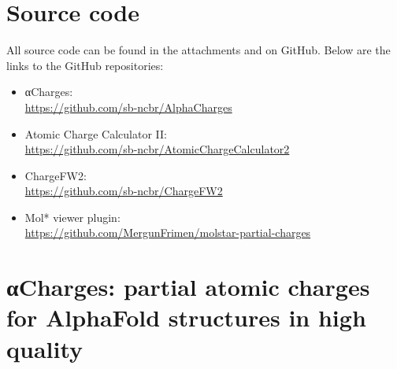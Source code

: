 \documentclass[
  digital,     %
  oneside,     %
  nosansbold,  %
  nocolorbold, %
  lof,         %
  lot,         %
]{fithesis4}
\begin{document}
\begin{appendices}
  \chapter{Source code}
  \label{appendix:source-code}
  All source code can be found in the attachments and on GitHub. Below are the links to the GitHub repositories:
  \begin{itemize}
    \item αCharges: \\
    \url{https://github.com/sb-ncbr/AlphaCharges}
    \item Atomic Charge Calculator II: \\
    \url{https://github.com/sb-ncbr/AtomicChargeCalculator2}
    \item ChargeFW2: \\
    \url{https://github.com/sb-ncbr/ChargeFW2}
    \item Mol* viewer plugin: \\
    \url{https://github.com/MergunFrimen/molstar-partial-charges}
  \end{itemize}

  \chapter[αCharges paper]{αCharges: partial atomic charges for AlphaFold
  structures in high quality}
  \label{appendix:alpha-charges}
  
\end{appendices}
\end{document}
